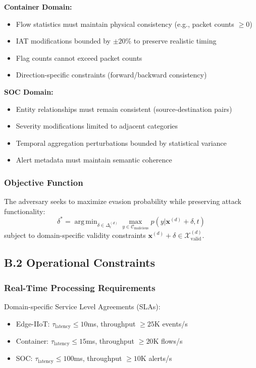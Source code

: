 \documentclass[12pt]{article}
\DeclareMathOperator*{\argmin}{arg\,min}
\begin{document}
\textbf{Container Domain:}
\begin{itemize}
\item Flow statistics must maintain physical consistency (e.g., packet counts $\geq 0$)
\item IAT modifications bounded by $\pm 20\%$ to preserve realistic timing
\item Flag counts cannot exceed packet counts
\item Direction-specific constraints (forward/backward consistency)
\end{itemize}

\textbf{SOC Domain:}
\begin{itemize}
\item Entity relationships must remain consistent (source-destination pairs)
\item Severity modifications limited to adjacent categories
\item Temporal aggregation perturbations bounded by statistical variance
\item Alert metadata must maintain semantic coherence
\end{itemize}

\subsubsection{Objective Function}
The adversary seeks to maximize evasion probability while preserving attack functionality:
\begin{equation}
\delta^* = \argmin_{\delta \in \Delta_{\epsilon}^{(d)}} \max_{y \in \mathcal{C}_{\text{malicious}}} p(y|\mathbf{x}^{(d)} + \delta, t)
\end{equation}
subject to domain-specific validity constraints $\mathbf{x}^{(d)} + \delta \in \mathcal{X}_{\text{valid}}^{(d)}$.

\subsection{B.2 Operational Constraints}

\subsubsection{Real-Time Processing Requirements}
Domain-specific Service Level Agreements (SLAs):
\begin{itemize}
\item Edge-IIoT: $\tau_{\text{latency}} \leq 10$ms, throughput $\geq 25$K events/s
\item Container: $\tau_{\text{latency}} \leq 15$ms, throughput $\geq 20$K flows/s  
\item SOC: $\tau_{\text{latency}} \leq 100$ms, throughput $\geq 10$K alerts/s
\end{itemize}
\end{document}

